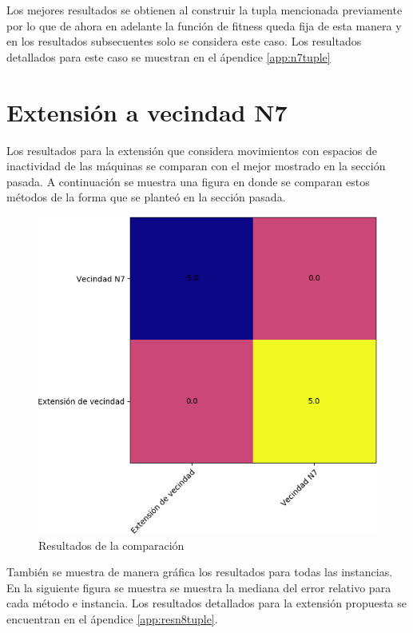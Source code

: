 Los mejores resultados se obtienen al construir la tupla mencionada previamente por lo que de ahora en adelante la función de fitness queda fija de esta manera y en los resultados subsecuentes solo se considera este caso. Los resultados detallados para este caso se muestran en el ápendice \ref{app:n7tuple}

\section{Extensión a vecindad N7}
Los resultados para la extensión que considera movimientos con espacios de inactividad de las máquinas se comparan con el mejor mostrado en la sección pasada. A continuación se muestra una figura en donde se comparan estos métodos de la forma que se planteó en la sección pasada.

\begin{figure}[H]
    \centering
    \includegraphics[scale=.7]{Imagenes/n8vsn7.png}
    \caption{Resultados de la comparación}
\end{figure}

También se muestra de manera gráfica los resultados para todas las instancias. En la siguiente figura se muestra se muestra la mediana del error relativo para cada método e instancia.  Los resultados detallados para la extensión propuesta se encuentran en el ápendice \ref{app:resn8tuple}.

